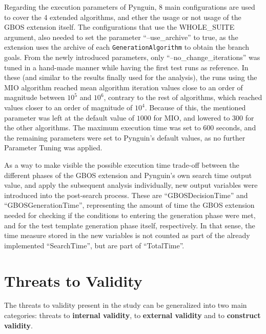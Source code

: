 \documentclass[%
  chapterprefix=false,%
  open=right,%
  twoside=true,%
  paper=a4,%
  logofile={Figures/logo.png},%
  thesistype=master,%
  UKenglish,%
]{se2thesis}
\newcommand{\classname}[1]{\texttt{#1}}
\begin{document}
Regarding the execution parameters of Pynguin, 8 main configurations are used to cover the 4 extended algorithms, and ether the usage or not usage of the GBOS extension itself.
The configurations that use the WHOLE\_SUITE argument, also needed to set the parameter ``--use\_archive'' to true, as the extension uses the archive of each \classname{GenerationAlgorithm} to obtain the branch goals.
From the newly introduced parameters, only ``--no\_change\_iterations'' was tuned in a hand-made manner while having the first test runs as reference.
In these (and similar to the results finally used for the analysis), the runs using the MIO algorithm reached mean algorithm iteration values close to an order of magnitude between \(10^5\) and \(10^6\), contrary to the rest of algorithms, which reached values closer to an order of magnitude of \(10^4\).
Because of this, the mentioned parameter was left at the default value of \(1000\) for MIO, and lowered to \(300\) for the other algorithms.
The maximum execution time was set to 600 seconds, and the remaining parameters were set to Pynguin's default values, as no further Parameter Tuning was applied.

As a way to make visible the possible execution time trade-off between the different phases of the GBOS extension and Pynguin's own search time output value, and apply the subsequent analysis individually, new output variables were introduced into the post-search process.
These are ``GBOSDecisionTime'' and ``GBOSGenerationTime'', representing the amount of time the GBOS extension needed for checking if the conditions to entering the generation phase were met, and for the test template generation phase itself, respectively.
In that sense, the time measure stored in the new variables is not counted as part of the already implemented ``SearchTime'', but are part of ``TotalTime''.

\section{Threats to Validity}

The threats to validity present in the study can be generalized into two main categories: threats to \textbf{internal validity}, to \textbf{external validity} and to \textbf{construct validity}.
\end{document}
